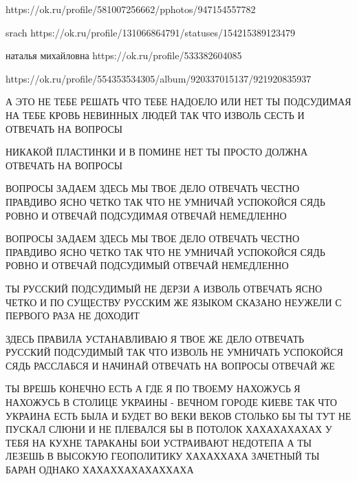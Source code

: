  
 
 
 
 



https://ok.ru/profile/581007256662/pphotos/947154557782

srach
https://ok.ru/profile/131066864791/statuses/154215389123479

наталья михайловна
https://ok.ru/profile/533382604085

https://ok.ru/profile/554353534305/album/920337015137/921920835937

А ЭТО НЕ ТЕБЕ РЕШАТЬ ЧТО ТЕБЕ НАДОЕЛО ИЛИ НЕТ ТЫ ПОДСУДИМАЯ НА ТЕБЕ КРОВЬ
НЕВИННЫХ ЛЮДЕЙ ТАК ЧТО ИЗВОЛЬ СЕСТЬ И ОТВЕЧАТЬ НА ВОПРОСЫ

НИКАКОЙ ПЛАСТИНКИ И В ПОМИНЕ НЕТ ТЫ ПРОСТО ДОЛЖНА ОТВЕЧАТЬ НА ВОПРОСЫ

ВОПРОСЫ ЗАДАЕМ ЗДЕСЬ МЫ ТВОЕ ДЕЛО ОТВЕЧАТЬ ЧЕСТНО ПРАВДИВО ЯСНО ЧЕТКО ТАК ЧТО
НЕ УМНИЧАЙ УСПОКОЙСЯ СЯДЬ РОВНО И ОТВЕЧАЙ ПОДСУДИМАЯ ОТВЕЧАЙ НЕМЕДЛЕННО

ВОПРОСЫ ЗАДАЕМ ЗДЕСЬ МЫ ТВОЕ ДЕЛО ОТВЕЧАТЬ ЧЕСТНО ПРАВДИВО ЯСНО ЧЕТКО ТАК ЧТО
НЕ УМНИЧАЙ УСПОКОЙСЯ СЯДЬ РОВНО И ОТВЕЧАЙ ПОДСУДИМЫЙ ОТВЕЧАЙ НЕМЕДЛЕННО

ТЫ РУССКИЙ ПОДСУДИМЫЙ НЕ ДЕРЗИ А ИЗВОЛЬ ОТВЕЧАТЬ ЯСНО ЧЕТКО И ПО СУЩЕСТВУ
РУССКИМ ЖЕ ЯЗЫКОМ СКАЗАНО НЕУЖЕЛИ С ПЕРВОГО РАЗА НЕ ДОХОДИТ

ЗДЕСЬ ПРАВИЛА УСТАНАВЛИВАЮ Я ТВОЕ ЖЕ ДЕЛО ОТВЕЧАТЬ РУССКИЙ ПОДСУДИМЫЙ ТАК ЧТО
ИЗВОЛЬ НЕ УМНИЧАТЬ УСПОКОЙСЯ СЯДЬ РАССЛАБСЯ И НАЧИНАЙ ОТВЕЧАТЬ НА ВОПРОСЫ
ОТВЕЧАЙ ЖЕ

ТЫ ВРЕШЬ КОНЕЧНО ЕСТЬ А ГДЕ Я ПО ТВОЕМУ НАХОЖУСЬ Я НАХОЖУСЬ В СТОЛИЦЕ УКРАИНЫ -
ВЕЧНОМ ГОРОДЕ КИЕВЕ ТАК ЧТО УКРАИНА ЕСТЬ БЫЛА И БУДЕТ ВО ВЕКИ ВЕКОВ СТОЛЬКО БЫ
ТЫ ТУТ НЕ ПУСКАЛ СЛЮНИ И НЕ ПЛЕВАЛСЯ БЫ В ПОТОЛОК ХАХАХАХАХАХ У ТЕБЯ НА КУХНЕ
ТАРАКАНЫ БОИ УСТРАИВАЮТ НЕДОТЕПА А ТЫ ЛЕЗЕШЬ В ВЫСОКУЮ ГЕОПОЛИТИКУ ХАХАХХАХА
ЗАЧЕТНЫЙ ТЫ БАРАН ОДНАКО ХАХАХХАХАХАХХАХА

